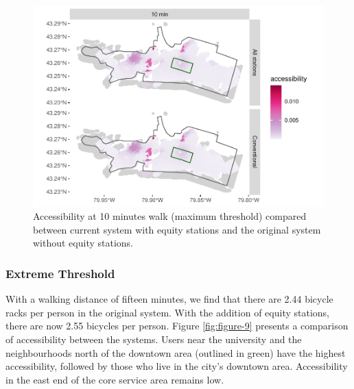 \documentclass[]{elsarticle} %
\begin{document}
\begin{figure}

{\centering \includegraphics[width=0.9\linewidth]{Bike-share-spatial-equity_files/figure-latex/figure-8-1} 

}

\caption{Accessibility at 10 minutes walk (maximum threshold) compared between current system with equity stations and the original system without equity stations.}\label{fig:figure-8}
\end{figure}

\hypertarget{extreme-threshold}{%
\subsubsection{Extreme Threshold}\label{extreme-threshold}}

With a walking distance of fifteen minutes, we find that there are 2.44
bicycle racks per person in the original system. With the addition of
equity stations, there are now 2.55 bicycles per person. Figure
\ref{fig:figure-9} presents a comparison of accessibility between the
systems. Users near the university and the neighbourhoods north of the
downtown area (outlined in green) have the highest accessibility,
followed by those who live in the city's downtown area. Accessibility in
the east end of the core service area remains low.
\end{document}
